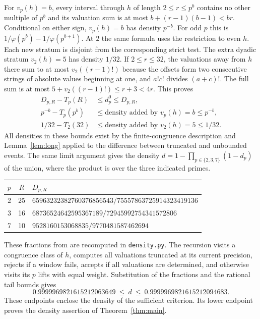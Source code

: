 \documentclass[11pt]{article}
\begin{document}
For $v_p(h)=b$, every interval through $h$ of length $2\le r\le p^b$ contains no other multiple of $p^b$ and its valuation sum is at most $b+(r-1)(b-1)<br$. Conditional on either sign, $v_p(h)=b$ has density $p^{-b}$. For odd $p$ this is $1/\varphi(p^b)-1/\varphi(p^{b+1})$. At $2$ the same formula uses the restriction to even $h$. Each new stratum is disjoint from the corresponding strict test. The extra dyadic stratum $v_2(h)=5$ has density $1/32$. If $2\le r\le32$, the valuations away from $h$ there sum to at most $v_2((r-1)!)$ because the offsets form two consecutive strings of absolute values beginning at one, and $a!c!$ divides $(a+c)!$. The full sum is at most $5+v_2((r-1)!)\le r+3<4r$. This proves
\begin{align*}
 D_{p,R}-T_p(R)&\le d^0_p\le D_{p,R},\\
 p^{-b}-T_p(p^b)&\le \text{density added by }v_p(h)=b\le p^{-b},\\
 1/32-T_2(32)&\le \text{density added by }v_2(h)=5\le 1/32 .
\end{align*}
All densities in these bounds exist by the finite-congruence description and Lemma~\ref{lem:long} applied to the difference between truncated and unbounded events. The same limit argument gives the density $d=1-\prod_{p\in\{2,3,7\}}(1-d_p)$ of the union, where the product is over the three indicated primes.

\begin{center}\small
\begin{tabular}{ccl}
\toprule
$p$&$R$&$D_{p,R}$\\ \midrule
2&25&$65963232382760376856543/75557863725914323419136$\\
3&16&$68736524642595367189/72945992754341572806$\\
7&10&$9528160153068835/9770481587462694$\\ \bottomrule
\end{tabular}
\end{center}
These fractions from \cite{repo} are recomputed in \texttt{density.py}. The recursion visits a congruence class of $h$, computes all valuations truncated at its current precision, rejects if a window fails, accepts if all valuations are determined, and otherwise visits its $p$ lifts with equal weight. Substitution of the fractions and the rational tail bounds gives
\[
 0.9999969821615212063649\ \le\ d\ \le\ 0.9999969821615212094683 .
\]
These endpoints enclose the density of the sufficient criterion. Its lower endpoint proves the density assertion of Theorem~\ref{thm:main}.
\end{document}
